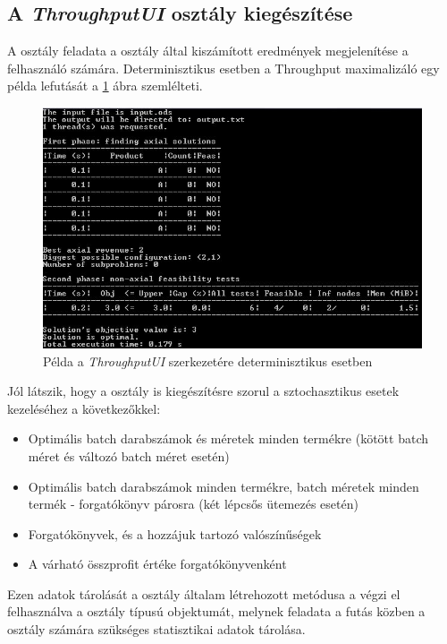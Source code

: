 \subsection{A \textit{ThroughputUI} osztály kiegészítése}
A  osztály feladata a  osztály által kiszámított eredmények megjelenítése a felhasználó számára.
Determinisztikus esetben a Throughput maximalizáló egy példa lefutását a \ref{ThroughputUI} ábra szemlélteti.
\begin{figure}[H]
\begin{center}
\includegraphics[scale=0.62]{throughputUI}
\caption{Példa a \textit{ThroughputUI} szerkezetére determinisztikus esetben}
\label{ThroughputUI}
\end{center}
\end{figure}
Jól látszik, hogy a  osztály is kiegészítésre szorul a sztochasztikus esetek kezeléséhez a következőkkel:
\begin{itemize}
\item Optimális batch darabszámok és méretek minden termékre (kötött batch méret és változó batch méret esetén)
\item Optimális batch darabszámok minden termékre, batch méretek minden termék - forgatókönyv párosra (két lépcsős ütemezés esetén)
\item Forgatókönyvek, és a hozzájuk tartozó valószínűségek
\item A várható összprofit értéke forgatókönyvenként
\end{itemize}
Ezen adatok tárolását a  osztály általam létrehozott metódusa a  végzi el felhasználva a  osztály  típusú objektumát, melynek feladata a futás közben a  osztály számára szükséges statisztikai adatok tárolása.
